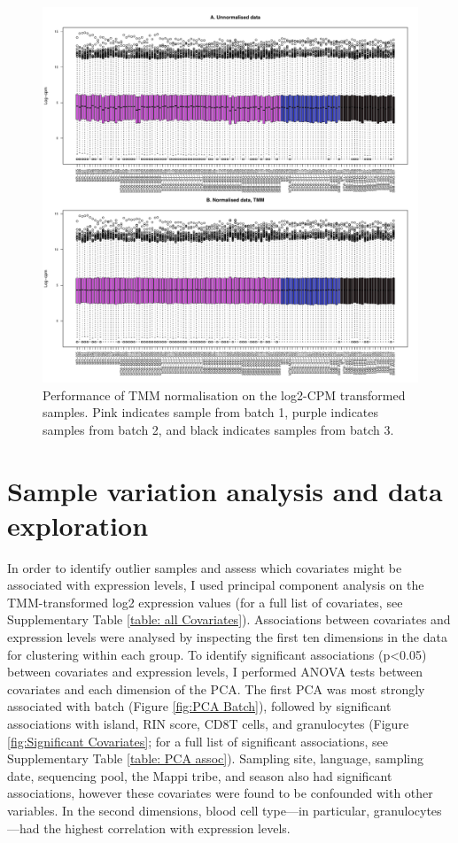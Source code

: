 \documentclass[12pt,a4paper,titlepage,twoside,openright]{book}
\begin{document}
\begin{mainmatter}
{{\begin{figure}[htb!]
\centering
\includegraphics[width=\textwidth,height=\textheight,keepaspectratio]{Figures/NormalisedGeneExpressionDistribution_IndoRNA_TMM.pdf}
\caption{Performance of TMM normalisation on the log2-CPM transformed samples. Pink indicates sample from batch 1, purple indicates samples from batch 2, and black indicates samples from batch 3.}
\label{fig:TMM normalisation}
\end{figure}

\section{Sample variation analysis and data exploration}
In order to identify outlier samples and assess which covariates might be associated with expression levels, I used principal component analysis on the TMM-transformed log2 expression values (for a full list of covariates, see Supplementary Table \ref{table: all Covariates}). Associations between covariates and expression levels were analysed by inspecting the first ten dimensions in the data for clustering within each group. To identify significant associations (p<0.05) between covariates and expression levels, I performed ANOVA tests between covariates and each dimension of the PCA. The first PCA was most strongly associated with batch (﻿Figure \ref{fig:PCA Batch}), followed by significant associations with island, RIN score, CD8T cells, and granulocytes (﻿Figure \ref{fig:Significant Covariates}; for a full list of significant associations, see Supplementary Table \ref{table: PCA assoc}). Sampling site, language, sampling date, sequencing pool, the Mappi tribe, and season also had significant associations, however these covariates were found to be confounded with other variables. In the second dimensions, blood cell type—in particular, granulocytes—had the highest correlation with expression levels. 

}}
\end{mainmatter}
\end{document}
